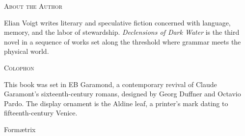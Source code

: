 \documentclass[11pt,oneside]{book}
\begin{document}
\clearpage
\thispagestyle{empty}
\vspace*{2.4in}
\begin{center}
{\scshape\small About the Author}
\end{center}
\vspace{1.5em}
\noindent Elian Voigt writes literary and speculative fiction concerned with language, memory, and the labor of stewardship. \textit{Declensions of Dark Water} is the third novel in a sequence of works set along the threshold where grammar meets the physical world.

\vfill
\begin{center}
{\scshape\small Colophon}

\vspace{0.8em}
\vspace{0.8em}
{\small This book was set in EB Garamond, a contemporary revival of Claude Garamont's sixteenth-century romans, designed by Georg Duffner and Octavio Pardo. The display ornament is the Aldine leaf, a printer's mark dating to fifteenth-century Venice.\par}
\vspace{1.5em}
{\ebgaramond{}\small Form\ae trix\par}
\end{center}
\vspace*{0.6in}
\end{document}
